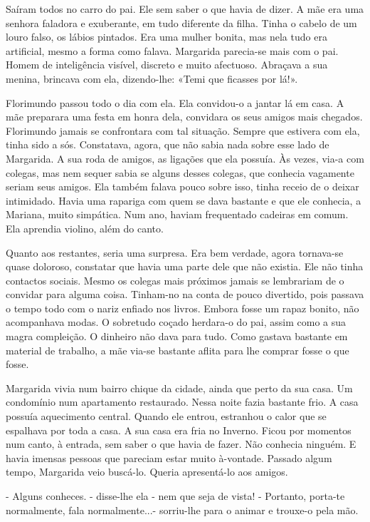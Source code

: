 Saíram todos no carro do pai. Ele sem saber o que havia de dizer. A mãe
era uma senhora faladora e exuberante, em tudo diferente da filha. Tinha
o cabelo de um louro falso, os lábios pintados. Era uma mulher bonita,
mas nela tudo era artificial, mesmo a forma como falava. Margarida
parecia-se mais com o pai. Homem de inteligência visível, discreto e
muito afectuoso. Abraçava a sua menina, brincava com ela, dizendo-lhe:
«Temi que ficasses por lá!».

Florimundo passou todo o dia com ela. Ela convidou-o a jantar lá em
casa. A mãe preparara uma festa em honra dela, convidara os seus amigos
mais chegados. Florimundo jamais se confrontara com tal situação. Sempre
que estivera com ela, tinha sido a sós. Constatava, agora, que não sabia
nada sobre esse lado de Margarida. A sua roda de amigos, as ligações que
ela possuía. Às vezes, via-a com colegas, mas nem sequer sabia se alguns
desses colegas, que conhecia vagamente seriam seus amigos. Ela também
falava pouco sobre isso, tinha receio de o deixar intimidado. Havia uma
rapariga com quem se dava bastante e que ele conhecia, a Mariana, muito
simpática. Num ano, haviam frequentado cadeiras em comum. Ela aprendia
violino, além do canto.

Quanto aos restantes, seria uma surpresa. Era bem verdade, agora
tornava-se quase doloroso, constatar que havia uma parte dele que não
existia. Ele não tinha contactos sociais. Mesmo os colegas mais próximos
jamais se lembrariam de o convidar para alguma coisa. Tinham-no na conta
de pouco divertido, pois passava o tempo todo com o nariz enfiado nos
livros. Embora fosse um rapaz bonito, não acompanhava modas. O sobretudo
coçado herdara-o do pai, assim como a sua magra compleição. O dinheiro
não dava para tudo. Como gastava bastante em material de trabalho, a mãe
via-se bastante aflita para lhe comprar fosse o que fosse.

Margarida vivia num bairro chique da cidade, ainda que perto da sua
casa. Um condomínio num apartamento restaurado. Nessa noite fazia
bastante frio. A casa possuía aquecimento central. Quando ele entrou,
estranhou o calor que se espalhava por toda a casa. A sua casa era fria
no Inverno. Ficou por momentos num canto, à entrada, sem saber o que
havia de fazer. Não conhecia ninguém. E havia imensas pessoas que
pareciam estar muito à-vontade. Passado algum tempo, Margarida veio
buscá-lo. Queria apresentá-lo aos amigos.

- Alguns conheces. - disse-lhe ela - nem que seja de vista! - Portanto,
porta-te normalmente, fala normalmente...- sorriu-lhe para o animar e
trouxe-o pela mão.

